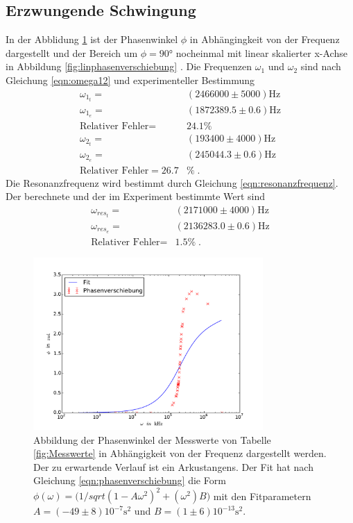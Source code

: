 \subsection{Erzwungende Schwingung}
In der Abblidung \ref{fig:phasenverschiebung} ist der Phasenwinkel $\phi$ in Abhängingkeit
von der Frequenz dargestellt und der Bereich um $\phi=90°$ nocheinmal mit
linear skalierter x-Achse in Abbildung \ref{fig:linphasenverschiebung} . Die
Frequenzen $\omega_{1}$ und
$\omega_{2}$  sind nach Gleichung \eqref{eqn:omega12} und experimenteller Bestimmung
\begin{align*}
  \omega_{1_t}=&(2466000\pm5000)\si{\hertz}\\
  \omega_{1_e}=&(1872389.5\pm0.6)\si{\hertz}\\
  \text{Relativer Fehler}=&24.1\%\\
  \omega_{2_t}=&(193400\pm4000)\si{\hertz}\\
  \omega_{2_e}=&(245044.3\pm0.6)\si{\hertz}\\
  \text{Relativer Fehler}=26.7&\%\;.
\end{align*}
Die Resonanzfrequenz wird bestimmt durch Gleichung \eqref{eqn:resonanzfrequenz}.
Der berechnete und der im Experiment bestimmte Wert sind
\begin{align*}
\omega_{res_t}=&(2171000\pm4000)\si{\hertz}\\
\omega_{res_e}=&(2136283.0\pm0.6)\si{\hertz}\\
\text{Relativer Fehler}=&1.5\%\;.
\end{align*}
\begin{figure}
  \centering
  \includegraphics[width=0.78\textwidth]{phasenverschiebung.pdf}
  \caption{Abbildung der Phasenwinkel der Messwerte von Tabelle \ref{fig:Messwerte} in
  Abhängigkeit von der Frequenz dargestellt werden. Der zu erwartende Verlauf ist
  ein Arkustangens. Der Fit hat nach Gleichung \eqref{eqn:phasenverschiebung} die Form \\
  $\phi(\omega)=(1/sqrt{(1-A\omega^2)^2+(\omega^2)B)}$
  mit den Fitparametern \\
  $A=(-49\pm8)10^{-7}\si{\second}^2$ und $B=(1\pm6)10^{-13}\si{\second}^2$.}
  \label{fig:phasenverschiebung}
\end{figure}
